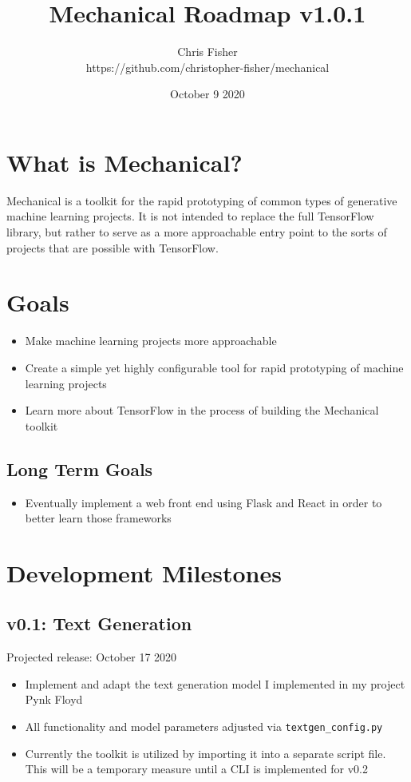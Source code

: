 \documentclass{article}
\title{Mechanical Roadmap v1.0.1}
\author{Chris Fisher
\\https://github.com/christopher-fisher/mechanical}
\date{October 9 2020}
\def\code#1{\texttt{#1}}
\begin{document}
\maketitle

\section{What is Mechanical?}
Mechanical is a toolkit for the rapid prototyping of common types of generative machine learning projects. It is not intended to replace the full TensorFlow library, but rather to serve as a more approachable entry point to the sorts of projects that are possible with TensorFlow.


\section{Goals}
\begin{itemize}
    \item Make machine learning projects more approachable
    \item Create a simple yet highly configurable tool for rapid prototyping of machine learning projects
    \item Learn more about TensorFlow in the process of building the Mechanical toolkit
\end{itemize}
\subsection{Long Term Goals}
\begin{itemize}
    \item Eventually implement a web front end using Flask and React in order to better learn those frameworks
\end{itemize}

\section{Development Milestones}
\subsection{v0.1: Text Generation}
Projected release: October 17 2020
\begin{itemize}
    \item Implement and adapt the text generation model I implemented in my project Pynk Floyd
    \item All functionality and model parameters adjusted via \code{textgen\_config.py}
    \item Currently the toolkit is utilized by importing it into a separate script file. This will be a temporary measure until a CLI is implemented for v0.2
\end{itemize}
\end{document}
